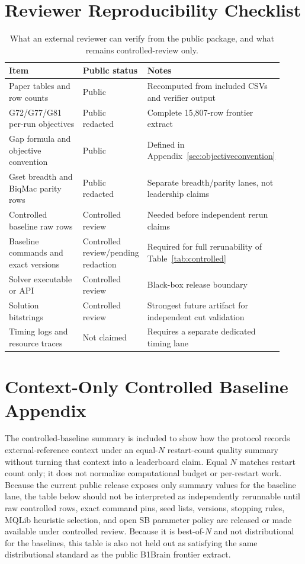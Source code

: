 \documentclass[11pt]{article}
\begin{document}
\section{Reviewer Reproducibility Checklist}
\begin{table}[H]
\centering
\caption{What an external reviewer can verify from the public package, and what remains controlled-review only.}
\label{tab:reviewchecklist}
\footnotesize
\begin{tabular}{@{}L{0.31\linewidth}L{0.22\linewidth}L{0.39\linewidth}@{}}
\toprule
Item & Public status & Notes \\
\midrule
Paper tables and row counts & Public & Recomputed from included CSVs and verifier output \\
G72/G77/G81 per-run objectives & Public redacted & Complete 15,807-row frontier extract \\
Gap formula and objective convention & Public & Defined in Appendix~\ref{sec:objectiveconvention} \\
Gset breadth and BiqMac parity rows & Public redacted & Separate breadth/parity lanes, not leadership claims \\
Controlled baseline raw rows & Controlled review & Needed before independent rerun claims \\
Baseline commands and exact versions & Controlled review/pending redaction & Required for full rerunability of Table~\ref{tab:controlled} \\
Solver executable or API & Controlled review & Black-box release boundary \\
Solution bitstrings & Controlled review & Strongest future artifact for independent cut validation \\
Timing logs and resource traces & Not claimed & Requires a separate dedicated timing lane \\
\bottomrule
\end{tabular}
\end{table}

\clearpage

\section{Context-Only Controlled Baseline Appendix}
\label{sec:controlledappendix}
The controlled-baseline summary is included to show how the protocol records external-reference context under an equal-$N$ restart-count quality summary without turning that context into a leaderboard claim. Equal $N$ matches restart count only; it does not normalize computational budget or per-restart work. Because the current public release exposes only summary values for the baseline lane, the table below should not be interpreted as independently rerunnable until raw controlled rows, exact command pins, seed lists, versions, stopping rules, MQLib heuristic selection, and open SB parameter policy are released or made available under controlled review. Because it is best-of-$N$ and not distributional for the baselines, this table is also not held out as satisfying the same distributional standard as the public B1Brain frontier extract.
\end{document}
